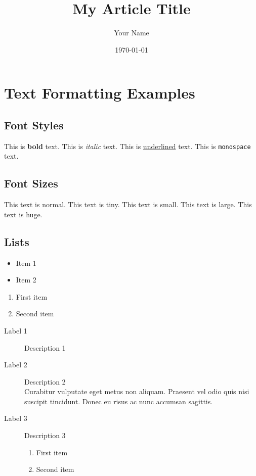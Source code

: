 \documentclass{article}
\title{My Article Title}
\author{Your Name}
\date{\today} %
\begin{document}
\maketitle



\section{Text Formatting Examples}

\subsection{Font Styles}

This is \textbf{bold} text. This is \textit{italic} text. This is \underline{underlined} text. This is \texttt{monospace} text.

\subsection{Font Sizes}

This text is normal.
\tiny{This text is tiny.} 
\small{This text is small.} 
\large{This text is large.} 
\huge{This text is huge.}
\normalsize

\subsection{Lists}

\begin{itemize}
  \item Item 1
  \item Item 2
\end{itemize}

\begin{enumerate}
  \item First item
  \item Second item
\end{enumerate}

\begin{description}
  \item[Label 1] Description 1
  \item[Label 2] Description 2 \\
  Curabitur vulputate eget metus non aliquam. Praesent vel odio quis nisi suscipit tincidunt. Donec eu risus ac nunc accumsan sagittis.
  \item[Label 3] Description 3
  	\begin{enumerate}
  		\item First item
  		\item Second item
	\end{enumerate}
\end{description}
\end{document}
